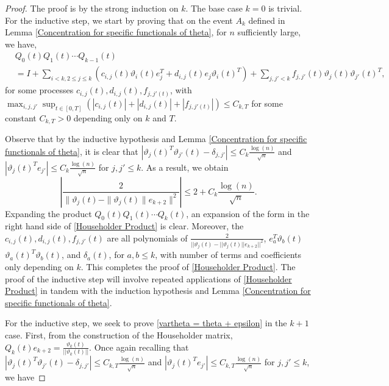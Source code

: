 \documentclass[10pt,a4paper]{amsart}
\begin{document}
\begin{proof}
The proof is by the strong induction on $k$. The base case $k=0$ is trivial. For the inductive step, we start by proving that on the event $A_k$ defined in Lemma \ref{Concentration for specific functionals of theta}, for $n$ sufficiently large, we have,
\begin{equation}\label{Householder Product}
        \begin{split}
            &Q_0(t)Q_1(t)\cdots Q_{k-1}(t)\\
            &=I +\sum_{i < k, 2\leq j \leq k} \left(c_{i,j}(t) \vartheta_i(t)e_j^T+d_{i,j}(t) e_j\vartheta_i(t)^T\right)+\sum_{j,j' < k} f_{j,j'}(t) \vartheta_j(t)\vartheta_{j'}(t)^T,
        \end{split}
    \end{equation}
for some processes $c_{i,j}(t), d_{i,j}(t), f_{j,j'(t)}$, with $\max_{i,j,j'} \sup_{t \in [0,T]} (|c_{i,j}(t)|+ |d_{i,j}(t)|+|f_{j,j'(t)}|) \leq C_{k,T}$ for some constant $C_{k,T}>0$ depending only on $k$ and $T$. 


Observe that by the inductive hypothesis and Lemma \ref{Concentration for specific functionals of theta}, it is clear that $|\vartheta_j(t)^T \vartheta_{j'}(t)-\delta_{j,j'}| \leq C_k \frac{\log(n)}{\sqrt{n}}$ and $|\vartheta_j(t)^T e_{j'}|\leq C_k \frac{\log(n)}{\sqrt{n}}$ for $j, j' \leq k$. As a result, we obtain
\begin{equation*}
   \left| \frac{2}{\|\vartheta_j(t)-\|\vartheta_j(t)\|e_{k+2}\|^2}\right| \leq 2+C_k\frac{\log(n)}{\sqrt{n}}.
\end{equation*}
Expanding the product $Q_0(t)Q_1(t)\cdots Q_{k}(t)$, an expansion of the form in the right hand side of \eqref{Householder Product} is clear. Moreover, the $c_{i,j}(t),d_{i,j}(t), f_{j,j'}(t)$ are all polynomials of $\frac{2}{||\vartheta_j(t)-||\vartheta_j(t)||e_{k+2}||^2}$, $e_a^T \vartheta_b(t)$ $\vartheta_a(t)^T \vartheta_b(t)$, and $\delta_a(t)$, for $a,b \leq k$, with number of terms and coefficients only depending on $k$. This completes the proof of \eqref{Householder Product}. The proof of the inductive step will involve repeated applications of \eqref{Householder Product} in tandem with the induction hypothesis and Lemma \ref{Concentration for specific functionals of theta}.

For the inductive step, we seek to prove  \eqref{vartheta = theta + epsilon} in the $k+1$ case. First, from the construction of the Householder matrix, $Q_k(t)e_{k+2}=\frac{\vartheta_k(t)}{||\vartheta_k(t)||}$. Once again recalling that $|\vartheta_j(t)^T \vartheta_{j'}(t)-\delta_{j,j'}| \leq C_{k,T} \frac{\log(n)}{\sqrt{n}}$ and $|\vartheta_j(t)^T e_{j'}|\leq C_{k,T} \frac{\log(n)}{\sqrt{n}}$ for $j, j' \leq k$, we have 


\end{proof}
\end{document}
